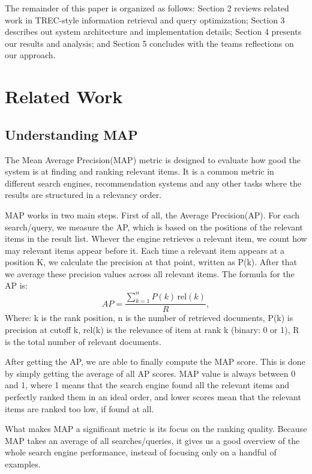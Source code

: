 \documentclass[sigplan,screen,nonacm]{acmart}
\begin{document}
The remainder of this paper is organized as follows: Section 2 reviews related work in TREC-style information retrieval and query optimization; Section 3 describes out system architecture and implementation details; Section 4 presents our results and analysis; and Section 5 concludes with the teams reflections on our approach.

\section{Related Work}

\subsection{Understanding MAP}
The Mean Average Precision(MAP) metric is designed to evaluate how good the system is at finding and ranking relevant items. It is a common metric in different search engines, recommendation systems and any other tasks where the results are structured in a relevancy order\cite{Bronson2025}.

MAP works in two main steps. First of all, the Average Precision(AP). For each search/query, we measure the AP, which is based on the positions of the relevant items in the result list. Whever the engine retrieves a relevant item, we count how may relevant items appear before it. Each time a relevant item appears at a position K, we calculate the precision at that point, written as P(k). After that we average these precision values across all relevant items. The formula for the AP is:
\[
AP = \frac{\sum_{k=1}^{n} P(k)\,\text{rel}(k)}{R},
\]
Where: k is the rank position, n is the number of retrieved documents, P(k) is precision at cutoff k, rel(k) is the relevance of item at rank k (binary: 0 or 1), R is the total number of relevant documents.

After getting the AP, we are able to finally compute the MAP score. This is done by simply getting the average of all AP scores. MAP value is always between 0 and 1, where 1 means that the search engine found all the relevant items and perfectly ranked them in an ideal order, and lower scores mean that the relevant items are ranked too low, if found at all. 

What makes MAP a significant metric is its focus on the ranking quality. Because MAP takes an average of all searches/queries, it gives us a good overview of the whole search engine performance, instead of focusing only on a handful of examples. 
\end{document}
